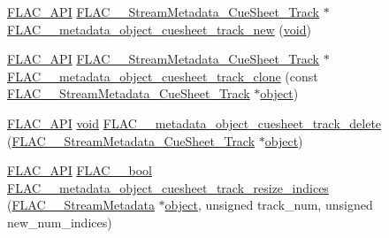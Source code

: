 \begin{DoxyCompactItemize}
\item 
\mbox{\hyperlink{group__flac__export_ga56ca07df8a23310707732b1c0007d6f5}{F\+L\+A\+C\+\_\+\+A\+PI}} \mbox{\hyperlink{struct_f_l_a_c_____stream_metadata___cue_sheet___track}{F\+L\+A\+C\+\_\+\+\_\+\+Stream\+Metadata\+\_\+\+Cue\+Sheet\+\_\+\+Track}} $\ast$ \mbox{\hyperlink{group__flac__metadata__object_ga9bc27c6ed075c29d12027079e00d9997}{F\+L\+A\+C\+\_\+\+\_\+metadata\+\_\+object\+\_\+cuesheet\+\_\+track\+\_\+new}} (\mbox{\hyperlink{_s_d_l__opengles2__gl2ext_8h_ae5d8fa23ad07c48bb609509eae494c95}{void}})
\item 
\mbox{\hyperlink{group__flac__export_ga56ca07df8a23310707732b1c0007d6f5}{F\+L\+A\+C\+\_\+\+A\+PI}} \mbox{\hyperlink{struct_f_l_a_c_____stream_metadata___cue_sheet___track}{F\+L\+A\+C\+\_\+\+\_\+\+Stream\+Metadata\+\_\+\+Cue\+Sheet\+\_\+\+Track}} $\ast$ \mbox{\hyperlink{group__flac__metadata__object_gaf085bed12af15034839307ca04286d4f}{F\+L\+A\+C\+\_\+\+\_\+metadata\+\_\+object\+\_\+cuesheet\+\_\+track\+\_\+clone}} (const \mbox{\hyperlink{struct_f_l_a_c_____stream_metadata___cue_sheet___track}{F\+L\+A\+C\+\_\+\+\_\+\+Stream\+Metadata\+\_\+\+Cue\+Sheet\+\_\+\+Track}} $\ast$\mbox{\hyperlink{_s_d_l__opengl__glext_8h_ab49790263c78300fbf05719e38246198}{object}})
\item 
\mbox{\hyperlink{group__flac__export_ga56ca07df8a23310707732b1c0007d6f5}{F\+L\+A\+C\+\_\+\+A\+PI}} \mbox{\hyperlink{_s_d_l__opengles2__gl2ext_8h_ae5d8fa23ad07c48bb609509eae494c95}{void}} \mbox{\hyperlink{group__flac__metadata__object_ga8fbf8912add405a4b1acd510b6e27c89}{F\+L\+A\+C\+\_\+\+\_\+metadata\+\_\+object\+\_\+cuesheet\+\_\+track\+\_\+delete}} (\mbox{\hyperlink{struct_f_l_a_c_____stream_metadata___cue_sheet___track}{F\+L\+A\+C\+\_\+\+\_\+\+Stream\+Metadata\+\_\+\+Cue\+Sheet\+\_\+\+Track}} $\ast$\mbox{\hyperlink{_s_d_l__opengl__glext_8h_ab49790263c78300fbf05719e38246198}{object}})
\item 
\mbox{\hyperlink{group__flac__export_ga56ca07df8a23310707732b1c0007d6f5}{F\+L\+A\+C\+\_\+\+A\+PI}} \mbox{\hyperlink{ordinals_8h_a95103469f1cbd78b8cf250194985b34e}{F\+L\+A\+C\+\_\+\+\_\+bool}} \mbox{\hyperlink{group__flac__metadata__object_ga57dfba89ba704574bde4e3fcd925d473}{F\+L\+A\+C\+\_\+\+\_\+metadata\+\_\+object\+\_\+cuesheet\+\_\+track\+\_\+resize\+\_\+indices}} (\mbox{\hyperlink{struct_f_l_a_c_____stream_metadata}{F\+L\+A\+C\+\_\+\+\_\+\+Stream\+Metadata}} $\ast$\mbox{\hyperlink{_s_d_l__opengl__glext_8h_ab49790263c78300fbf05719e38246198}{object}}, unsigned track\+\_\+num, unsigned new\+\_\+num\+\_\+indices)
\item 

\end{DoxyCompactItemize}
